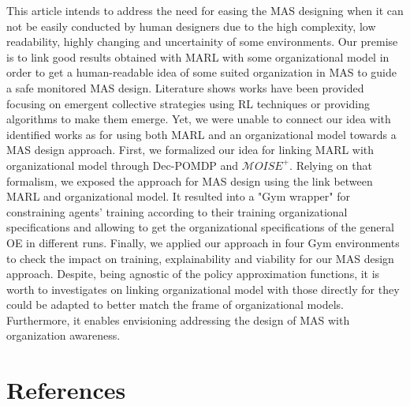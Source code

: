 \documentclass[runningheads]{llncs}
\begin{document}
This article intends to address the need for easing the MAS designing when it can not be easily conducted by human designers due to the high complexity, low readability, highly changing and uncertainity of some environments. Our premise is to link good results obtained with MARL with some organizational model in order to get a human-readable idea of some suited organization in MAS to guide a safe monitored MAS design. Literature shows works have been provided focusing on emergent collective strategies using RL techniques or providing algorithms to make them emerge. Yet, we were unable to connect our idea with identified works as for using both MARL and an organizational model towards a MAS design approach. First, we formalized our idea for linking MARL with organizational model through Dec-POMDP and $\mathcal{M}OISE^+$. Relying on that formalism, we exposed the approach for MAS design using the link between MARL and organizational model. It resulted into a "Gym wrapper" for constraining agents' training according to their training organizational specifications and allowing to get the organizational specifications of the general OE in different runs. Finally, we applied our approach in four Gym environments to check the impact on training, explainability and viability for our MAS design approach. Despite, being agnostic of the policy approximation functions, it is worth to investigates on linking organizational model with those directly for they could be adapted to better match the frame of organizational models. Furthermore, it enables envisioning addressing the design of MAS with organization awareness.


%
%
% 
% 
%
\section*{References}

% 



\end{document}
